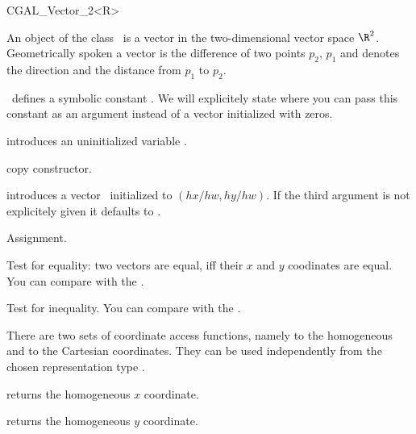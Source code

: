 
\begin {classtemplate} {CGAL_Vector_2<R>}


An object of the class \classname\ is a vector in the two-dimensional 
vector space $\R^2$. Geometrically spoken a vector is the difference
of two points $p_2$, $p_1$ and denotes the direction and the distance
from   $p_1$ to $p_2$. 

\cgal\ defines a symbolic constant . We 
will explicitely state where you can pass this constant as an argument
instead of a vector initialized with zeros.


\creation
{}


\hidden{}
             {introduces an uninitialized variable \var.}

\hidden {}
 	    {copy constructor.}

            {introduces a vector \var\ initialized to $(hx/hw,hy/hw)$.
             If the third argument is not explicitely given it defaults
             to .}


\operations
\threecolumns{5cm}{4cm}

\hidden {}
        {Assignment.}

       {Test for equality: two vectors are equal, iff their $x$ and $y$ 
        coodinates are equal. You can compare with the
        .}

       {Test for inequality. You can compare with the
        .}


There are two sets of coordinate access functions, namely to the
homogeneous and to the Cartesian coordinates. They can be used
independently from the chosen representation type .

       {returns the homogeneous $x$ coordinate.}

       {returns the homogeneous $y$ coordinate.}


\end{classtemplate}

